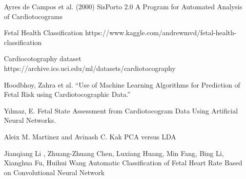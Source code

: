 \documentclass[a4paper,12pt]{article}
\begin{document}
\begin{thebibliography}{9}
Ayres de Campos et al. (2000) SisPorto 2.0 A Program for Automated Analysis of Cardiotocograms

Fetal Health Classification https://www.kaggle.com/andrewmvd/fetal-health-classification

Cardiocotography dataset https://archive.ics.uci.edu/ml/datasets/cardiotocography

Hoodbhoy, Zahra et al. “Use of Machine Learning Algorithms for Prediction of Fetal Risk using Cardiotocographic Data.”

Yılmaz, E. Fetal State Assessment from Cardiotocogram Data Using Artificial Neural Networks.

Aleix M. Martinez and Avinash C. Kak PCA versus LDA

Jianqiang Li , Zhuang-Zhuang Chen, Luxiang Huang, Min Fang, Bing Li, Xianghua Fu, Huihui Wang Automatic Classification of Fetal Heart Rate Based on Convolutional Neural Network

\end{thebibliography}
\end{document}
